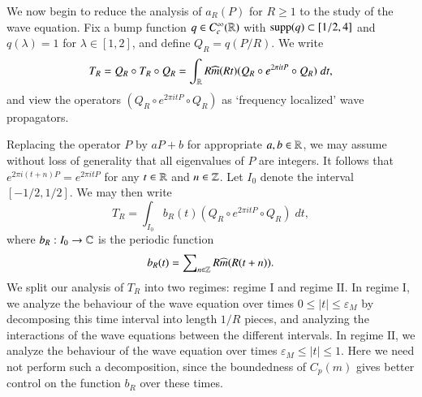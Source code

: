 We now begin to reduce the analysis of $a_R(P)$ for $R \geq 1$ to the study of the wave equation. Fix a bump function $q \in C_c^\infty(\operatorname{\mathbb{R}})$ with $\operatorname{\text{supp}}(q) \subset [1/2,4]$ and $q(\lambda) = 1$ for $\lambda \in [1,2]$, and define $Q_R = q(P/R)$. %
We write
%
\begin{equation}
    T_R = Q_R \circ T_R \circ Q_R = \int_{\operatorname{\mathbb{R}}} R \widehat{m}(R t) (Q_R \circ e^{2 \pi i t P} \circ Q_R)\; dt,
\end{equation}
%
and view the operators $(Q_R \circ e^{2 \pi i t P} \circ Q_R)$ as `frequency localized' wave propagators.

Replacing the operator $P$ by $aP + b$ for appropriate $a,b \in \operatorname{\mathbb{R}}$, we may assume without loss of generality that all eigenvalues of $P$ are integers. It follows that $e^{2 \pi i (t + n) P} = e^{2 \pi i t P}$ for any $t \in \operatorname{\mathbb{R}}$ and $n \in \operatorname{\mathbb{Z}}$. Let $I_0$ denote the interval $[-1/2,1/2]$. We may then write
%
\begin{equation}
    T_R = \int_{I_0} b_R(t) (Q_R \circ e^{2 \pi i tP} \circ Q_R)\; dt,
\end{equation}
%
where $b_R: I_0 \to \operatorname{\mathbb{C}}$ is the periodic function
%
\begin{equation}
    b_R(t) = \sum\nolimits_{n \in \operatorname{\mathbb{Z}}} R \widehat{m}(R (t + n)).
\end{equation}
We split our analysis of $T_R$ into two regimes: regime $\text{I}$ and regime $\text{II}$. In regime $\text{I}$, we analyze the behaviour of the wave equation over times $0 \leq |t| \leq \varepsilon_M$ by decomposing this time interval into length $1/R$ pieces, and analyzing the interactions of the wave equations between the different intervals. In regime $\text{II}$, we analyze the behaviour of the wave equation over times $\varepsilon_M \leq |t| \leq 1$. Here we need not perform such a decomposition, since the boundedness of $C_p(m)$ gives better control on the function $b_R$ over these times.

